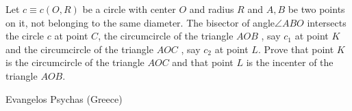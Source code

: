 Let ${c\equiv c\left(O, R\right)}$ be a circle with center ${O}$ and radius ${R}$ and ${A, B}$ be two points on it, not belonging to the same diameter. The bisector of angle${\angle{ABO}}$ intersects the circle ${c}$ at point ${C}$, the circumcircle of the triangle $AOB$ , say ${c_1}$ at point ${K}$ and the circumcircle of the triangle $AOC$ , say ${{c}_{2}}$ at point ${L}$. Prove that point ${K}$ is the circumcircle of the triangle $AOC$ and that point ${L}$ is the incenter of the triangle $AOB$.

Evangelos Psychas (Greece)